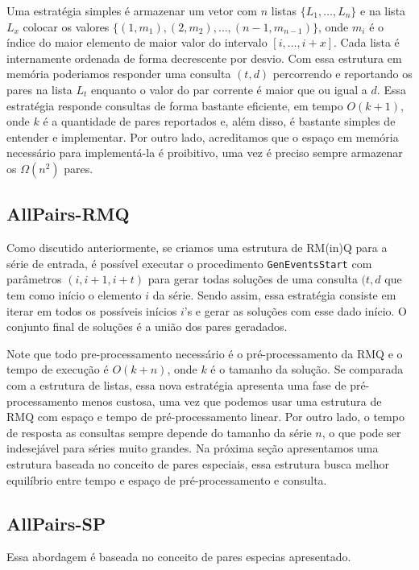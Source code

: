 \documentclass[12pt]{article}
\begin{document}
Uma estratégia simples é armazenar um vetor com $n$ listas $\{L_1, \ldots, L_n\}$ e na lista $L_x$ colocar os valores 
$\{(1, m_1), (2, m_2), \ldots, (n-1, m_{n-1})\}$, onde $m_i$ é o índice do maior elemento de maior valor do intervalo $[i, \ldots, i + x]$. 
Cada lista é internamente ordenada de forma decrescente por desvio. 
Com essa estrutura em memória poderiamos responder uma consulta $(t, d)$ percorrendo e reportando os pares na lista $L_t$ enquanto o valor do par corrente é maior que ou igual a $d$. Essa estratégia responde consultas de forma bastante eficiente, em tempo $O(k + 1)$, onde $k$ é a quantidade de pares reportados e, além disso, é bastante simples de entender e implementar. Por outro lado, acreditamos que o espaço em memória necessário para implementá-la é proibitivo, uma vez é preciso sempre armazenar os $\Omega(n^2)$ pares.  

\subsection{AllPairs-RMQ}

Como discutido anteriormente, se criamos uma estrutura de RM(in)Q para a série
de entrada, é possível executar o procedimento {\tt GenEventsStart} com parâmetros
$(i, i + 1, i + t)$ para gerar todas soluções de uma consulta $(t, d$ que tem como
início o elemento $i$ da série. Sendo assim, essa estratégia consiste em iterar 
em todos os possíveis inícios $i$'s e gerar as soluções com esse dado início. 
O conjunto final de soluções é a união dos pares geradados. 

Note que todo pre-processamento necessário é o pré-processamento
da RMQ e o tempo de execução é $O(k + n)$, onde $k$ é o tamanho da solução.
Se comparada com a estrutura de listas, essa nova estratégia apresenta uma
fase de pré-processamento menos custosa, uma vez que podemos usar uma
estrutura de RMQ com espaço e tempo de pré-processamento linear. Por outro lado,
o tempo de resposta as consultas sempre depende do tamanho da série $n$, o que
pode ser indesejável para séries muito grandes. Na próxima seção apresentamos
uma estrutura baseada no conceito de pares especiais, essa estrutura busca
melhor equilíbrio entre tempo e espaço de pré-processamento e consulta. 

\subsection{AllPairs-SP}

Essa abordagem é baseada no conceito de pares especias apresentado.
\end{document}
